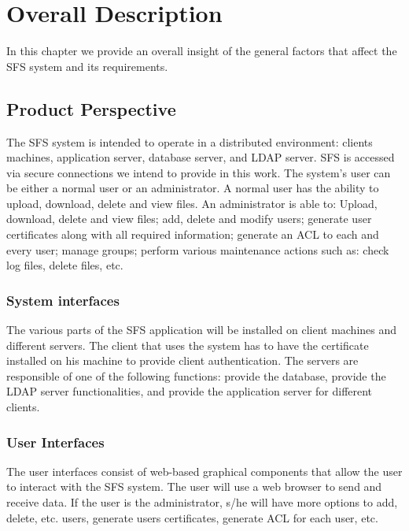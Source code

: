 

\chapter{Overall Description}

In this chapter we provide an overall insight of the general factors
that affect the SFS system and its requirements.

\section{Product Perspective}

The SFS system is intended to operate in a distributed environment:
clients machines, application server, database server, and LDAP
server. SFS is accessed via secure connections we intend to provide
in this work. The system's user can be either a normal user or an
administrator. A normal user has the ability to upload, download,
delete and view files. An administrator is able to: Upload,
download, delete and view files; add, delete and modify users;
generate user certificates along with all required information;
generate an ACL to each and every user; manage groups; perform
various maintenance actions such as: check log files, delete files,
etc.

\subsection{System interfaces}

The various parts of the SFS application will be installed on client
machines and different servers. The client that uses the system has
to have the certificate installed on his machine to provide client
authentication. The servers are responsible of one of the following
functions: provide the database, provide the LDAP server
functionalities, and provide the application server for different
clients.

\subsection{User Interfaces}

The user interfaces consist of web-based graphical components that
allow the user to interact with the SFS system. The user will use a
web browser to send and receive data. If the user is the
administrator, s/he will have more options to add, delete, etc.
users, generate users certificates, generate ACL for each user, etc.

